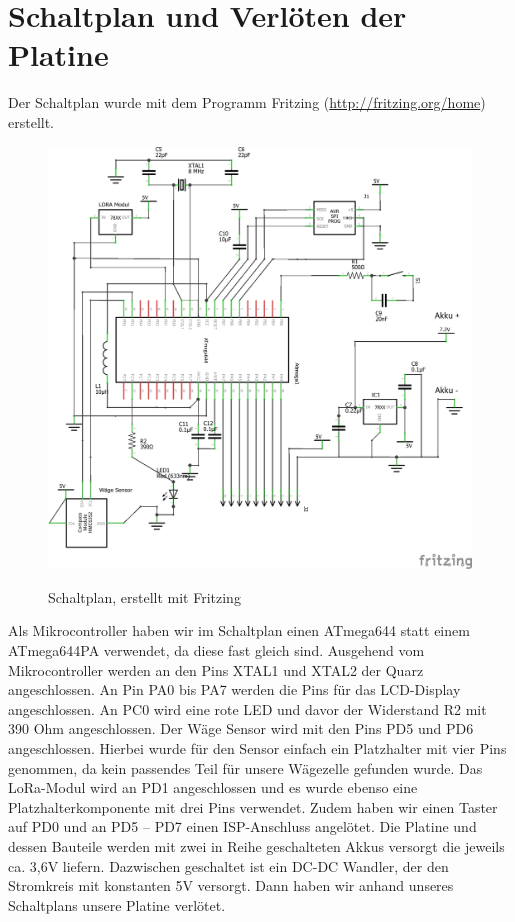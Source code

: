 \chapter{Schaltplan und Verlöten der Platine}
Der Schaltplan wurde mit dem Programm Fritzing (\url{http://fritzing.org/home}) erstellt.
\begin{figure}[ht]
    \center
    \includegraphics[width=15cm]{Bilder/schaltplan-1.png}\\
    \caption{Schaltplan, erstellt mit Fritzing}
    \label{fig:schaltplan}
\end{figure}
\newpage
\noindent
Als Mikrocontroller haben wir im Schaltplan einen ATmega644 statt einem ATmega644PA verwendet, da diese fast gleich sind. Ausgehend vom Mikrocontroller werden an den Pins XTAL1 und XTAL2 der Quarz angeschlossen. An Pin PA0 bis PA7 werden die Pins für das LCD-Display angeschlossen. An PC0 wird eine rote LED und davor der Widerstand R2 mit 390 Ohm angeschlossen. Der Wäge Sensor wird mit den Pins PD5 und PD6 angeschlossen. Hierbei wurde für den Sensor einfach ein Platzhalter mit vier Pins genommen, da kein passendes Teil für unsere Wägezelle gefunden wurde. Das LoRa-Modul wird an PD1 angeschlossen und es wurde ebenso eine Platzhalterkomponente mit drei Pins verwendet. Zudem haben wir einen Taster auf PD0 und an PD5 – PD7 einen ISP-Anschluss angelötet. Die Platine und dessen Bauteile werden mit zwei in Reihe geschalteten Akkus versorgt die jeweils ca. 3,6V liefern. Dazwischen geschaltet ist ein DC-DC Wandler, der den Stromkreis mit konstanten 5V versorgt. Dann haben wir anhand unseres Schaltplans unsere Platine verlötet.\\

